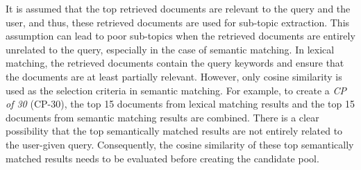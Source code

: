 
It is assumed that the top retrieved documents are relevant to the query and the user, and thus, these retrieved documents are used for sub-topic extraction. This assumption can lead to poor sub-topics when the retrieved documents are entirely unrelated to the query, especially in the case of semantic matching. In lexical matching, the retrieved documents contain the query keywords and ensure that the documents are at least partially relevant. However, only cosine similarity is used as the selection criteria in semantic matching. For example, to create a \textit{\ac{CP} of 30} (\ac{CP}-30), the top 15 documents from lexical matching results and the top 15 documents from semantic matching results are combined. There is a clear possibility that the top semantically matched results are not entirely related to the user-given query. Consequently, the cosine similarity of these top semantically matched results needs to be evaluated before creating the candidate pool.

